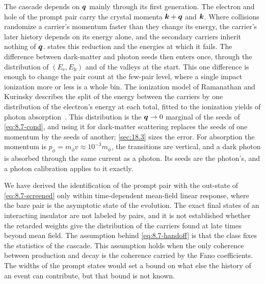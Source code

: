 The cascade depends on $\bm{q}$ mainly through its first generation. The electron and hole of the prompt pair carry the crystal momenta $\bm{k}+\bm{q}$ and $\bm{k}$. Where collisions randomize a carrier's momentum faster than they change its energy, the carrier's later history depends on its energy alone, and the secondary carriers inherit nothing of $\bm{q}$.  states this reduction and the energies at which it fails. The difference between dark-matter and photon seeds then enters once, through the distribution of $(E_{\mathrm{e}},E_{\mathrm{h}})$ and of the valleys at the start. This one difference is enough to change the pair count at the few-pair level, where a single impact ionization more or less is a whole bin. The ionization model of Ramanathan and Kurinsky describes the split of the energy between the carriers by one distribution of the electron's energy at each total, fitted to the ionization yields of photon absorption~\cite[Eqs.~(5)--(7)]{ramanathan2020ionization}. This distribution is the $\bm{q} \to 0$ marginal of the seeds of \cref{eq:8.7-cond}, and using it for dark-matter scattering replaces the seeds of one momentum by the seeds of another; \cref{sec:18.3} sizes the error. For absorption the momentum is $p_\phi = m_\phi v \approx 10^{-3}m_\phi$, the transitions are vertical, and a dark photon is absorbed through the same current as a photon. Its seeds are the photon's, and a photon calibration applies to it exactly.

We have derived the identification of the prompt pair with the out-state of \cref{eq:8.7-screened} only within time-dependent mean-field linear response, where the bare pair is the asymptotic state of the evolution. The exact final states of an interacting insulator are not labeled by pairs, and it is not established whether the retarded weights give the distribution of the carriers found at late times beyond mean field. The assumption behind \cref{eq:8.7-handoff} is that the class fixes the statistics of the cascade. This assumption holds when the only coherence between production and decay is the coherence carried by the Fano coefficients. The widths of the prompt states would set a bound on what else the history of an event can contribute, but that bound is not known.
